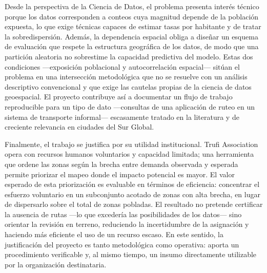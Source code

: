 Desde la perspectiva de la Ciencia de Datos, el problema presenta interés técnico porque
los datos corresponden a conteos cuya magnitud depende de la población expuesta, lo que
exige técnicas capaces de estimar tasas por habitante y de tratar la sobredispersión.
Además, la dependencia espacial obliga a diseñar un esquema de evaluación que respete la
estructura geográfica de los datos, de modo que una partición aleatoria no sobrestime la
capacidad predictiva del modelo. Estas dos condiciones —exposición poblacional y
autocorrelación espacial— sitúan el problema en una intersección metodológica que no se
resuelve con un análisis descriptivo convencional y que exige las cautelas propias de la
ciencia de datos geoespacial. El proyecto contribuye así a documentar un flujo de trabajo
reproducible para un tipo de dato —consultas de una aplicación de ruteo en un sistema de
transporte informal— escasamente tratado en la literatura y de creciente relevancia en
ciudades del Sur Global.

Finalmente, el trabajo se justifica por su utilidad institucional. Trufi Association opera
con recursos humanos voluntarios y capacidad limitada; una herramienta que ordene las
zonas según la brecha entre demanda observada y esperada permite priorizar el mapeo donde
el impacto potencial es mayor. El valor esperado de esta priorización es evaluable en
términos de eficiencia: concentrar el esfuerzo voluntario en un subconjunto acotado de
zonas con alta brecha, en lugar de dispersarlo sobre el total de zonas pobladas. El
resultado no pretende certificar la ausencia de rutas —lo que excedería las posibilidades
de los datos— sino orientar la revisión en terreno, reduciendo la incertidumbre de la
asignación y haciendo más eficiente el uso de un recurso escaso. En este sentido, la
justificación del proyecto es tanto metodológica como operativa: aporta un procedimiento
verificable y, al mismo tiempo, un insumo directamente utilizable por la organización
destinataria.
